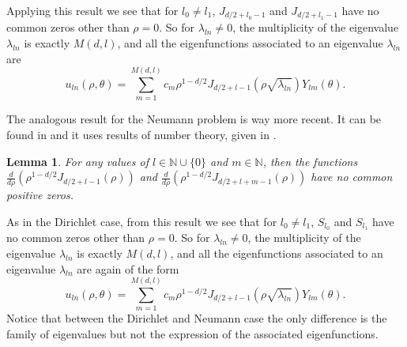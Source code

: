 \documentclass{amsart}
\newtheorem{lemma}[theorem]{Lemma}
\theoremstyle{definition}
\theoremstyle{remark}
\numberwithin{equation}{section}
\theoremstyle{definition}
\theoremstyle{remark}
\begin{document}
Applying this result we see that for $l_0\neq l_1$, $J_{d/2+l_0-1}$ and $J_{d/2+l_1-1}$ have no common zeros other than $\rho=0$. So for $\lambda_{ln}\neq 0$, the multiplicity of the eigenvalue $\lambda_{ln}$ is exactly $M(d,l)$, and all the eigenfunctions associated to an eigenvalue $\lambda_{ln}$ are \begin{equation*}
	u_{ln}(\rho,\theta)=\sum_{m=1}^{M(d,l)}c_m\rho^{1-d/2}J_{d/2+l-1}\left(\rho\sqrt{\lambda_{ln}}\right)Y_{lm}\left(\theta\right).
\end{equation*}

The analogous result for the Neumann problem is way more recent. It can be found in \cite[Lemma 2.4.]{Helf} and it uses results of number theory, given in \cite{Shi}.
\begin{lemma}
	For any values of $l\in\mathbb{N}\cup\{0\}$ and $m\in\mathbb{N}$, then the functions $\frac{d}{d\rho}\left(\rho^{1-d/2}J_{d/2+l-1}\left(\rho\right)\right)$ and $\frac{d}{d\rho}\left(\rho^{1-d/2}J_{d/2+l+m-1}\left(\rho\right)\right)$ have no common positive zeros. 
\end{lemma}
As in the Dirichlet case, from this result we see that for $l_0\neq l_1$, $S_{l_0}$ and $S_{l_1}$ have no common zeros other than $\rho=0$. So for $\lambda_{ln}\neq 0$, the multiplicity of the eigenvalue $\lambda_{ln}$ is exactly $M(d,l)$, and all the eigenfunctions associated to an eigenvalue $\lambda_{ln}$ are again of the form \begin{equation*}
	u_{ln}(\rho,\theta)=\sum_{m=1}^{M(d,l)}c_m\rho^{1-d/2}J_{d/2+l-1}\left(\rho\sqrt{\lambda_{ln}}\right)Y_{lm}\left(\theta\right).
\end{equation*}Notice that between the Dirichlet and Neumann case the only difference is the family of eigenvalues but not the expression of the associated eigenfunctions.
\end{document}
